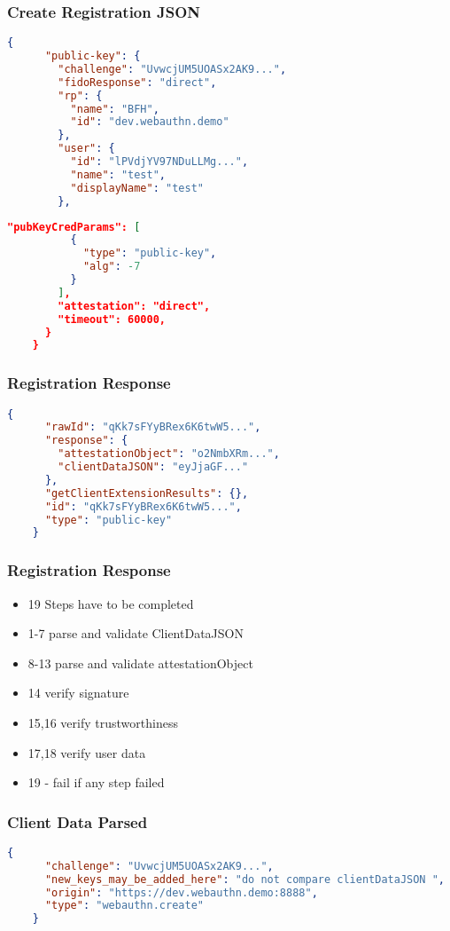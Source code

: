 \documentclass{beamer}
\begin{document}
\begin{frame}
  \frametitle{Create Registration JSON}
  \begin{lstlisting}[language=json]
    {
      "public-key": {
        "challenge": "UvwcjUM5UOASx2AK9...",
        "fidoResponse": "direct",
        "rp": {
          "name": "BFH",
          "id": "dev.webauthn.demo"
        },
        "user": {
          "id": "lPVdjYV97NDuLLMg...",
          "name": "test",
          "displayName": "test"
        },
  \end{lstlisting}
  \framebreak

  \begin{lstlisting}[language=json]
        "pubKeyCredParams": [
          {
            "type": "public-key",
            "alg": -7
          }
        ],
        "attestation": "direct",
        "timeout": 60000,
      }
    }
  \end{lstlisting}
\end{frame}

\begin{frame}[fragile]
  \frametitle{Registration Response}
  \begin{lstlisting}[language=json]
    {
      "rawId": "qKk7sFYyBRex6K6twW5...",
      "response": {
        "attestationObject": "o2NmbXRm...",
        "clientDataJSON": "eyJjaGF..."
      },
      "getClientExtensionResults": {},
      "id": "qKk7sFYyBRex6K6twW5...",
      "type": "public-key"
    }
  \end{lstlisting}
\end{frame}

\begin{frame}[fragile]
  \frametitle{Registration Response}
  \begin{itemize}
    \item 19 Steps have to be completed
    \item 1-7 parse and validate ClientDataJSON
    \item 8-13 parse and validate attestationObject
    \item 14 verify signature
    \item 15,16 verify trustworthiness 
    \item 17,18 verify user data
    \item 19 - fail if any step failed
  \end{itemize}
\end{frame}

\begin{frame}[fragile]
  \frametitle{Client Data Parsed}
  \begin{lstlisting}[language=json]
    {
      "challenge": "UvwcjUM5UOASx2AK9...",
      "new_keys_may_be_added_here": "do not compare clientDataJSON ",
      "origin": "https://dev.webauthn.demo:8888",
      "type": "webauthn.create"
    }
  \end{lstlisting}
\end{frame}
\end{document}

